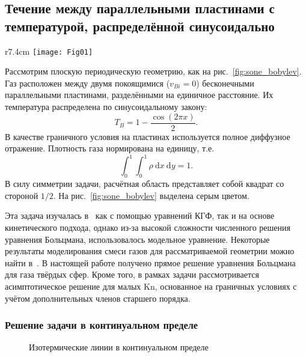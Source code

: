 \documentclass[
aps,%
12pt,%
final,%
notitlepage,%
oneside,%
onecolumn,%
nobibnotes,%
nofootinbib,%
superscriptaddress,%
noshowpacs,%
showkeys,%
floatfix,%
tightenlines,%
centertags]%
{revtex4}
\newcommand{\Kn}{\mathrm{Kn}}
\newcommand{\dd}{\:\mathrm{d}}
\begin{document}
\subsection{Течение между параллельными пластинами с температурой, распределённой синусоидально}

\begin{wrapfigure}{r}{7.4cm}
    \vspace{-10pt}
    \centering
    \texttt{[image: Fig01]}
    \vspace{-20pt}
    \caption{Геометрия задачи}\label{fig:sone_bobylev}
    \vspace{20pt}
\end{wrapfigure}

Рассмотрим плоскую периодическую геометрию, как на рис.~\ref{fig:sone_bobylev}.
Газ расположен между двумя покоящимися (\(v_{Bi} = 0\)) бесконечными параллельными пластинами,
разделёнными на единичное расстояние. Их температура распределена по синусоидальному закону:
\begin{equation}
    T_B = 1 - \frac{\cos(2\pi x)}{2}.
\end{equation}
В качестве граничного условия на пластинах используется полное диффузное отражение.
Плотность газа нормирована на единицу, т.е.
\begin{equation}\label{eq:total_mass}
    \int_0^1\int_0^1\rho\dd{x}\dd{y} = 1.
\end{equation}
В силу симметрии задачи, расчётная область представляет собой квадрат со стороной \(1/2\).
На рис.~\ref{fig:sone_bobylev} выделена серым цветом.

Эта задача изучалась в~\cite{Sone1996} как с помощью уравнений КГФ, так и на основе кинетического подхода,
однако из-за высокой сложности численного решения уравнения Больцмана, использовалось модельное уравнение.
Некоторые результаты моделирования смеси газов для рассматриваемой геометрии можно найти в~\cite{Wu2015}.
В настоящей работе получено прямое решение уравнения Больцмана для газа твёрдых сфер.
Кроме того, в рамках задачи рассмотривается асимптотическое решение для малых \(\Kn\),
основанное на граничных условиях с учётом дополнительных членов старшего порядка.

\subsubsection{Решение задачи в континуальном пределе}

\begin{figure}
    \centering
    \caption{Изотермические линии в континуальном пределе}
    \label{fig:continuum:temp}
\end{figure}
\end{document}
